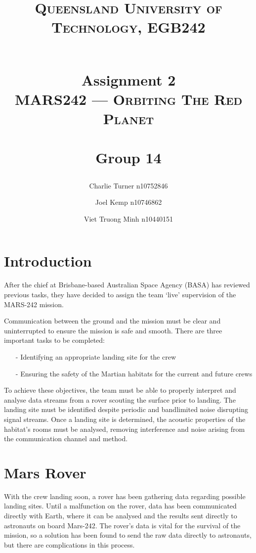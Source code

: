 \documentclass[12pt]{article}
\author{
    Charlie Turner \small n10752846 \and
    Joel Kemp \small n10746862 \and
    Viet Truong Minh \small n10440151
}
\title{
    \normalfont{} \normalsize{}
    \begin{flushleft}
        \textsc{Queensland University of Technology, EGB242} \\ [5pt]
    \end{flushleft}
    \horrule{0.5pt} \\[0.4cm]
    \huge Assignment 2 \\
    \large \textsc{MARS242 --- Orbiting The Red Planet}   \\ %
    \horrule{2pt} \\[0.2cm]
    \textbf{Group 14} \\
}
\numberwithin{equation}{section}
\numberwithin{figure}{section}
\numberwithin{table}{section}
\begin{document}
\begin{titlingpage}
    \maketitle
\end{titlingpage}

\section*{Introduction}

After the chief at Brisbane-based Australian Space Agency (BASA) has reviewed
previous tasks, they have decided to assign the team `live' supervision of the
MARS-242 mission.

Communication between the ground and the mission must be clear and
uninterrupted to ensure the mission is safe and smooth. There are three
important tasks to be completed:
\begin{itemize}
    \item[-] Identifying an appropriate landing site for the crew
    \item[-] Ensuring the safety of the Martian habitats for the current and future crews
\end{itemize}

To achieve these objectives, the team must be able to properly interpret and
analyse data streams from a rover scouting the surface prior to landing. The
landing site must be identified despite periodic and bandlimited noise
disrupting signal streams. Once a landing site is determined, the acoustic
properties of the habitat's rooms must be analysed, removing interference and
noise arising from the communication channel and method.

%
%
\section{Mars Rover}

With the crew landing soon, a rover has been gathering data regarding possible
landing sites. Until a malfunction on the rover, data has been communicated
directly with Earth, where it can be analysed and the results sent directly to
astronauts on board Mars-242. The rover's data is vital for the survival of the
mission, so a solution has been found to send the raw data directly to
astronauts, but there are complications in this process.
\end{document}
